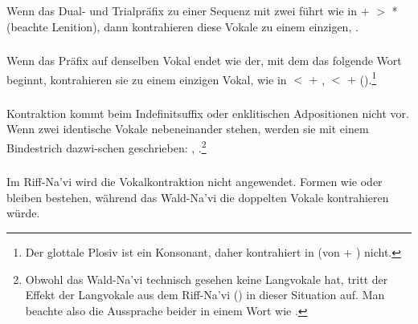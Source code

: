 \subsubsection{} Wenn das Dual- und Trialpräfix zu einer Sequenz mit zwei  führt wie in  $+$  $>$ * (beachte Lenition), dann kontrahieren diese Vokale zu einem einzigen, .
\label{lands:phonotactics:nsc} 

\subsubsection{} Wenn das Präfix auf denselben Vokal endet wie der, mit dem das folgende Wort beginnt, kontrahieren sie zu einem einzigen Vokal, wie in  $<$  $+$ ,  $<$  $+$  ().\footnote{Der glottale Plosiv ist ein Konsonant, daher kontrahiert  in  (von  $+$ ) nicht.}
\label{lands:phonotactics:precontract}

\subsubsection{} Kontraktion kommt beim Indefinitsuffix  oder enklitischen Adpositionen nicht vor. Wenn zwei identische Vokale nebeneinander stehen, werden sie mit einem Bindestrich dazwi-schen geschrieben:  ,  .\footnote{Obwohl das Wald-Na'vi technisch gesehen keine Langvokale hat, tritt der Effekt der Langvokale aus dem Riff-Na'vi () in dieser Situation auf. Man beachte also die Aussprache beider  in einem Wort wie .}

\subsubsection{} Im Riff-Na'vi wird die Vokalkontraktion nicht angewendet. Formen wie  oder  bleiben bestehen, während das Wald-Na'vi die doppelten Vokale kontrahieren würde.
\label{rn:no-contract}


